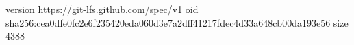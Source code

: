 version https://git-lfs.github.com/spec/v1
oid sha256:cea0dfe0fc2e6f235420eda060d3e7a2dff41217fdec4d33a648cb00da193e56
size 4388
